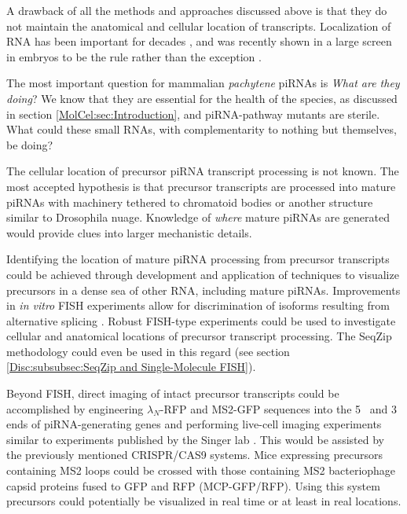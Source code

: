     A drawback of all the methods and approaches discussed above is that they do not maintain the anatomical and cellular location of transcripts. Localization of RNA has been important for decades \citep{Rebagliati1985}, and was recently shown in a large screen in \flies{} embryos to be the rule rather than the exception \citep{Lecuyer2007}.

    The most important question for mammalian \textit{pachytene} piRNAs is \textit{What are they doing}? We know that they are essential for the health of the species, as discussed in section \ref{MolCel:sec:Introduction}, and piRNA-pathway mutants are sterile. What could these small RNAs, with complementarity to nothing but themselves, be doing? 

    The cellular location of precursor piRNA transcript processing is not known. The most accepted hypothesis is that precursor transcripts are processed into mature piRNAs with machinery tethered to chromatoid bodies \citep{Meikar2011,Meikar2014} or another structure similar to Drosophila nuage. Knowledge of \textit{where} mature piRNAs are generated would provide clues into larger mechanistic details.

    Identifying the location of mature piRNA processing from precursor transcripts could be achieved through development and application of techniques to visualize precursors in a dense sea of other RNA, including mature piRNAs. Improvements in \textit{in vitro} FISH experiments allow for discrimination of isoforms resulting from alternative splicing \citep{Lee2014}. Robust FISH-type experiments could be used to investigate cellular and anatomical locations of precursor transcript processing. The SeqZip methodology could even be used in this regard (see section \ref{Disc:subsubsec:SeqZip and Single-Molecule FISH}).

    Beyond FISH, direct imaging of intact precursor transcripts could be accomplished by engineering $\lambda_{N}$-RFP \citep{Daigle2007} and MS2-GFP sequences into the 5\textprime~ and 3\textprime~ ends of piRNA-generating genes and performing live-cell imaging experiments similar to experiments published by the Singer lab \citep{Park2014}. This would be assisted by the previously mentioned CRISPR/CAS9 systems. Mice expressing precursors containing MS2 loops could be crossed with those containing MS2 bacteriophage capsid proteins fused to GFP and RFP (MCP-GFP/RFP). Using this system precursors could potentially be visualized in real time or at least in real locations.

